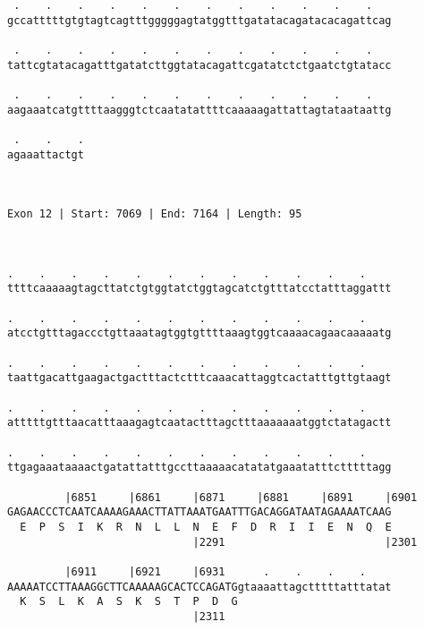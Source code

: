 \documentclass{article}
\begin{document}
\begin{Verbatim}
 .    .    .    .    .    .    .    .    .    .    .    .   
gccatttttgtgtagtcagtttgggggagtatggtttgatatacagatacacagattcag
                                                            
 .    .    .    .    .    .    .    .    .    .    .    .   
tattcgtatacagatttgatatcttggtatacagattcgatatctctgaatctgtatacc
                                                            
 .    .    .    .    .    .    .    .    .    .    .    .   
aagaaatcatgttttaagggtctcaatatattttcaaaaagattattagtataataattg
                                                            
 .    .    .
agaaattactgt
            
            
 
Exon 12 | Start: 7069 | End: 7164 | Length: 95



.    .    .    .    .    .    .    .    .    .    .    .    
ttttcaaaaagtagcttatctgtggtatctggtagcatctgtttatcctatttaggattt
                                                            
.    .    .    .    .    .    .    .    .    .    .    .    
atcctgtttagaccctgttaaatagtggtgttttaaagtggtcaaaacagaacaaaaatg
                                                            
.    .    .    .    .    .    .    .    .    .    .    .    
taattgacattgaagactgactttactctttcaaacattaggtcactatttgttgtaagt
                                                            
.    .    .    .    .    .    .    .    .    .    .    .    
atttttgtttaacatttaaagagtcaatactttagctttaaaaaaatggtctatagactt
                                                            
.    .    .    .    .    .    .    .    .    .    .    .    
ttgagaaataaaactgatattatttgccttaaaaacatatatgaaatatttctttttagg
                                                            
         |6851     |6861     |6871     |6881     |6891     |6901
GAGAACCCTCAATCAAAAGAAACTTATTAAATGAATTTGACAGGATAATAGAAAATCAAG
  E  P  S  I  K  R  N  L  L  N  E  F  D  R  I  I  E  N  Q  E
                             |2291                         |2301
  
         |6911     |6921     |6931      .    .    .    .    
AAAAATCCTTAAAGGCTTCAAAAAGCACTCCAGATGgtaaaattagctttttatttatat
  K  S  L  K  A  S  K  S  T  P  D  G                        
                             |2311                          
  

\end{Verbatim}
\end{document}
